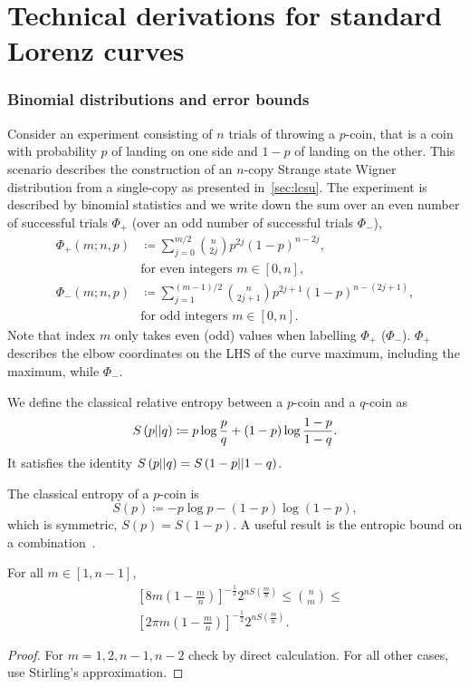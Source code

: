 \section{Technical derivations for standard Lorenz curves}
\label{app:lcsu_technical}

\subsubsection{Binomial distributions and error bounds}
Consider an experiment consisting of $n$ trials of throwing a $p$-coin, that is a coin with probability $p$ of landing on one side and $1-p$ of landing on the other.
This scenario describes the construction of an $n$-copy Strange state Wigner distribution from a single-copy as presented in~\cref{sec:lcsu}.
The experiment is described by binomial statistics and we write down the sum over an even number of successful trials $\Phi_+$ (over an odd number of successful trials $\Phi_-$),
\begin{align}	
	\Phi_+(m; n, p) &\coloneqq \sum\limits_{j=0}^{m/2} \binom{n}{2j} p^{2j} (1-p)^{n-2j}, \nonumber\\ 
	&\text{for even integers } m\in[0,n], \label{eq:fp} \\
	\Phi_-(m; n, p) &\coloneqq \sum\limits_{j=1}^{(m-1)/2} \binom{n}{2j+1} p^{2j+1} (1-p)^{n-(2j+1)}, \nonumber\\ 
	&\text{for odd integers } m\in[0,n]. \label{eq:fn2}
\end{align}
Note that index $m$ only takes even (odd) values when labelling $\Phi_+$ ($\Phi_-$).
$\Phi_+$ describes the elbow coordinates on the LHS of the curve maximum, including the maximum, while $\Phi_-$.

We define the classical relative entropy between a $p$-coin and a $q$-coin as
\begin{equation}\label{eq:ent_rel}
	S\left( p \middle\vert\middle\vert q \right) \coloneqq p \log{\frac{p}{q}} + (1-p) \log{\frac{1-p}{1-q}}.
\end{equation}
It satisfies the identity $S\left( p \middle\vert\middle\vert q \right) = S\left( 1-p \middle\vert\middle\vert 1-q \right)$.

The classical entropy of a $p$-coin is
\begin{equation}\label{eq:ent}
	S(p) \coloneqq -p\log{p} -(1-p)\log{(1-p)},
\end{equation}
which is symmetric, $S(p) = S(1-p)$.
A useful result is the entropic bound on a combination~\cite{cit:ash}.
\begin{lemma}\label{lem:comb_bounds}
	For all $m\in [1,n-1]$,
	\begin{align}
		&\left[ 8m\left(1-\frac{m}{n}\right) \right]^{-\frac{1}{2}} 2^{nS\left(\frac{m}{n}\right)} \leq \binom{n}{m} \leq \\
		&\left[ 2\pi m\left(1-\frac{m}{n}\right) \right]^{-\frac{1}{2}} 2^{nS\left(\frac{m}{n}\right)}.
	\end{align}
\end{lemma}
\begin{proof}
	For $m = 1,2, n-1, n-2$ check by direct calculation.	
	For all other cases, use Stirling's approximation.
\end{proof}

